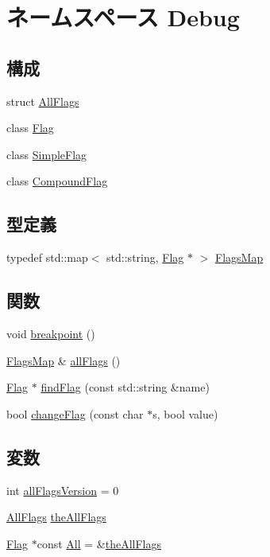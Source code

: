 \hypertarget{namespaceDebug}{
\section{ネームスペース Debug}
\label{namespaceDebug}
}
\subsection*{構成}
\begin{DoxyCompactItemize}
\item 
struct \hyperlink{structDebug_1_1AllFlags}{AllFlags}
\item 
class \hyperlink{classDebug_1_1Flag}{Flag}
\item 
class \hyperlink{classDebug_1_1SimpleFlag}{SimpleFlag}
\item 
class \hyperlink{classDebug_1_1CompoundFlag}{CompoundFlag}
\end{DoxyCompactItemize}
\subsection*{型定義}
\begin{DoxyCompactItemize}
\item 
typedef std::map$<$ std::string, \hyperlink{classDebug_1_1Flag}{Flag} $\ast$ $>$ \hyperlink{namespaceDebug_a5c634388b87790d313916f2477673979}{FlagsMap}
\end{DoxyCompactItemize}
\subsection*{関数}
\begin{DoxyCompactItemize}
\item 
void \hyperlink{namespaceDebug_a874043e2396dd8ce20ec7af3ea1e2a86}{breakpoint} ()
\item 
\hyperlink{namespaceDebug_a5c634388b87790d313916f2477673979}{FlagsMap} \& \hyperlink{namespaceDebug_ad113f4869bfc4806ae29d67a84446683}{allFlags} ()
\item 
\hyperlink{classDebug_1_1Flag}{Flag} $\ast$ \hyperlink{namespaceDebug_a49937a47d69d0ae4a3627b2097f829fa}{findFlag} (const std::string \&name)
\item 
bool \hyperlink{namespaceDebug_a0a79963bb41b5f1201bc625a735ad1de}{changeFlag} (const char $\ast$s, bool value)
\end{DoxyCompactItemize}
\subsection*{変数}
\begin{DoxyCompactItemize}
\item 
int \hyperlink{namespaceDebug_a7cf0381d0b0d459f506268caa88c5e99}{allFlagsVersion} = 0
\item 
\hyperlink{structDebug_1_1AllFlags}{AllFlags} \hyperlink{namespaceDebug_a9ecc3597d35f0460ed816b4309554e1f}{theAllFlags}
\item 
\hyperlink{classDebug_1_1Flag}{Flag} $\ast$const \hyperlink{namespaceDebug_a0aa922ff2898e57d5cca8539b128f028}{All} = \&\hyperlink{namespaceDebug_a9ecc3597d35f0460ed816b4309554e1f}{theAllFlags}
\end{DoxyCompactItemize}


